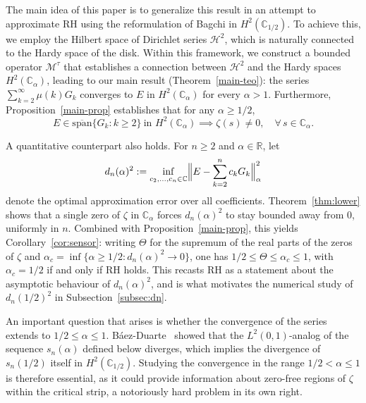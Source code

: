 \documentclass[11pt]{extarticle}
\numberwithin{equation}{section}
\theoremstyle{plain}
\theoremstyle{definition}
\begin{document}
The main idea of this paper is to generalize this 
result in an attempt to approximate RH using the reformulation of Bagchi in 
$H^2(\mathbb{C}_{1/2})$. To achieve this, we employ the Hilbert space of 
Dirichlet series $\mathcal{H}^2$, which is naturally connected to 
the Hardy space of the disk. Within this framework, we construct a bounded 
operator $\mathcal{M}^\tau$ that establishes a connection between $\mathcal{H}^2$ 
and the Hardy spaces $H^2(\mathbb{C}_\alpha)$, leading to our main result 
(Theorem~\ref{main-teo}): the series $\sum_{k=2}^{\infty}\mu(k)G_k$ converges 
to $E$ in $H^2(\mathbb{C}_\alpha)$ for every $\alpha > 1$. Furthermore, 
Proposition~\ref{main-prop} establishes that for any $\alpha \geq 1/2$,
\[
E \in \overline{\mathrm{span}}\{G_k : k \geq 2\} \ \text{in }
H^2(\mathbb{C}_\alpha) \implies \zeta(s) \neq 0, \quad \forall\, s \in \mathbb{C}_\alpha.
\]

A quantitative counterpart also holds. For $n \geq 2$ and $\alpha \in \mathbb{R}$, let
\[
d_n(\alpha)^2 := \inf_{c_2, \dots, c_n \in \mathbb{C}} \Bigl\| E - \sum_{k=2}^{n} c_k G_k \Bigr\|^2_\alpha
\]
denote the optimal approximation error over all coefficients. Theorem~\ref{thm:lower} shows that a
single zero of $\zeta$ in $\mathbb{C}_\alpha$ forces $d_n(\alpha)^2$ to stay
bounded away from $0$, uniformly in $n$. Combined with
Proposition~\ref{main-prop}, this yields Corollary~\ref{cor:sensor}: writing
$\Theta$ for the supremum of the real parts of the zeros of $\zeta$ and
$\alpha_c = \inf\{\alpha \geq 1/2 : d_n(\alpha)^2 \to 0\}$, one has
$1/2 \leq \Theta \leq \alpha_c \leq 1$, with $\alpha_c = 1/2$ if and only if RH
holds. This recasts RH as a statement about the asymptotic behaviour of
$d_n(\alpha)^2$, and is what motivates the numerical study of $d_n(1/2)^2$ in
Subsection~\ref{subsec:dn}.

An important question that arises is whether the convergence of the series
extends to $1/2 \leq \alpha \leq 1$. Báez-Duarte~\cite{baez-unitary} showed
that the $L^2(0,1)$-analog of the sequence $s_n(\alpha)$ defined below diverges, which implies the divergence of $s_n(1/2)$ itself
in $H^2(\mathbb{C}_{1/2})$. Studying the convergence in the range
$1/2 < \alpha \leq 1$ is therefore essential, as it could provide information
about zero-free regions of $\zeta$ within the critical strip, a notoriously
hard problem in its own right.
\end{document}

